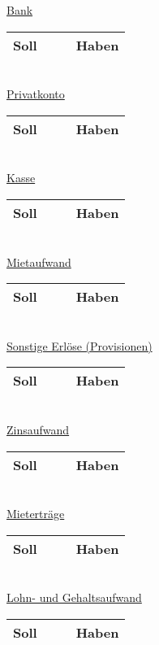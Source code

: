 \documentclass[paper=a4, fontsize=11pt]{scrartcl}
\numberwithin{equation}{section}
\numberwithin{figure}{section}
\numberwithin{table}{section}
\begin{document}
\underline{Bank}

\begin{tabular}{cc|cc}
\hline
Soll & & & Haben \\
\hline
\end{tabular}
\\

\underline{Privatkonto}

\begin{tabular}{cc|cc}
\hline
Soll & & & Haben \\
\hline
\end{tabular}
\\

\underline{Kasse}

\begin{tabular}{cc|cc}
\hline
Soll & & & Haben \\
\hline
\end{tabular}
\\

\underline{Mietaufwand}

\begin{tabular}{cc|cc}
\hline
Soll & & & Haben \\
\hline
\end{tabular}
\\

\underline{Sonstige Erlöse (Provisionen)}

\begin{tabular}{cc|cc}
\hline
Soll & & & Haben \\
\hline
\end{tabular}
\\

\underline{Zinsaufwand}

\begin{tabular}{cc|cc}
\hline
Soll & & & Haben \\
\hline
\end{tabular}
\\

\underline{Mieterträge}

\begin{tabular}{cc|cc}
\hline
Soll & & & Haben \\
\hline
\end{tabular}
\\

\underline{Lohn- und Gehaltsaufwand}

\begin{tabular}{cc|cc}
\hline
Soll & & & Haben \\
\hline
\end{tabular}
\\
\end{document}
